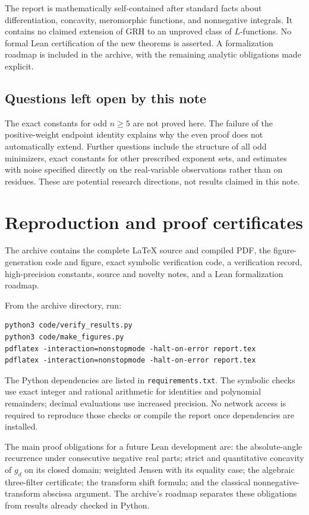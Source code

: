 \documentclass[11pt,a4paper]{article}
\theoremstyle{definition}\newtheorem{definition}[theorem]{Definition}
\theoremstyle{remark}\newtheorem{remark}[theorem]{Remark}
\begin{document}
The report is mathematically self-contained after standard facts about differentiation, concavity, meromorphic functions, and nonnegative integrals. It contains no claimed extension of GRH to an unproved class of $L$-functions. No formal Lean certification of the new theorems is asserted. A formalization roadmap is included in the archive, with the remaining analytic obligations made explicit.

\subsection{Questions left open by this note}
The exact constants for odd $n\ge5$ are not proved here. The failure of the positive-weight endpoint identity explains why the even proof does not automatically extend. Further questions include the structure of all odd minimizers, exact constants for other prescribed exponent sets, and estimates with noise specified directly on the real-variable observations rather than on residues. These are potential research directions, not results claimed in this note.

\appendix
\section{Reproduction and proof certificates}
The archive contains the complete \LaTeX{} source and compiled PDF, the figure-generation code and figure, exact symbolic verification code, a verification record, high-precision constants, source and novelty notes, and a Lean formalization roadmap.

From the archive directory, run:
\begin{verbatim}
python3 code/verify_results.py
python3 code/make_figures.py
pdflatex -interaction=nonstopmode -halt-on-error report.tex
pdflatex -interaction=nonstopmode -halt-on-error report.tex
\end{verbatim}
The Python dependencies are listed in \texttt{requirements.txt}. The symbolic checks use exact integer and rational arithmetic for identities and polynomial remainders; decimal evaluations use increased precision. No network access is required to reproduce those checks or compile the report once dependencies are installed.

The main proof obligations for a future Lean development are: the absolute-angle recurrence under consecutive negative real parts; strict and quantitative concavity of $g_d$ on its closed domain; weighted Jensen with its equality case; the algebraic three-filter certificate; the transform shift formula; and the classical nonnegative-transform abscissa argument. The archive's roadmap separates these obligations from results already checked in Python.
\end{document}
